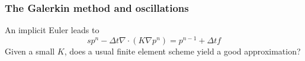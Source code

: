 \begin{frame}
\frametitle{The Galerkin method and oscillations}
An implicit Euler leads to  
\[
s p^n - \Delta t \nabla \cdot (K \nabla p^n) = p^{n-1} + \Delta t f   
\]
Given a small $K$, does a usual finite element scheme yield a good approximation? 
\end{frame}
